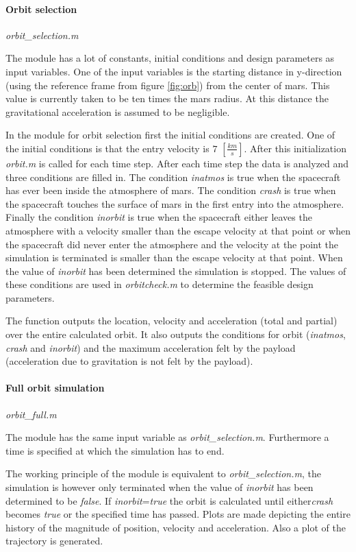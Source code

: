 \paragraph{Orbit selection} \textit{orbit\_selection.m}

The module has a lot of constants, initial conditions and design parameters as input variables. One of the input variables is the starting distance in y-direction (using the reference frame from figure \ref{fig:orb}) from the center of mars. This value is currently taken to be ten times the mars radius. At this distance the gravitational acceleration is assumed to be negligible. 

In the module for orbit selection first the initial conditions are created. One of the initial conditions is that the entry velocity is $7$ $[\frac{km}{s}]$. After this initialization \textit{orbit.m} is called for each time step. After each time step the data is analyzed and three conditions are filled in. The condition \textit{inatmos} is true when the spacecraft has ever been inside the atmosphere of mars. The condition \textit{crash} is true when the spacecraft touches the surface of mars in the first entry into the atmosphere. Finally the condition \textit{inorbit} is true when the spacecraft either leaves the atmosphere with a velocity smaller than the escape velocity at that point or when the spacecraft did never enter the atmosphere and the velocity at the point the simulation is terminated is smaller than the escape velocity at that point. When the value of \textit{inorbit} has been determined the simulation is stopped. The values of these conditions are used in \textit{orbitcheck.m} to determine the feasible design parameters.

The function outputs the location, velocity and acceleration (total and partial) over the entire calculated orbit. It also outputs the conditions for orbit (\textit{inatmos}, \textit{crash} and \textit{inorbit}) and the maximum acceleration felt by the payload (acceleration due to gravitation is not felt by the payload).

\paragraph{Full orbit simulation} \textit{orbit\_full.m}

The module has the same input variable as \textit{orbit\_selection.m}. Furthermore a time is specified at which the simulation has to end.

The working principle of the module is equivalent to \textit{orbit\_selection.m}, the simulation is however only terminated when the value of \textit{inorbit} has been determined to be \textit{false}. If \textit{inorbit}=\textit{true} the orbit is calculated until either\textit{crash} becomes \textit{true} or the specified time has passed. Plots are made depicting the entire history of the magnitude of position, velocity and acceleration. Also a plot of the trajectory is generated.

